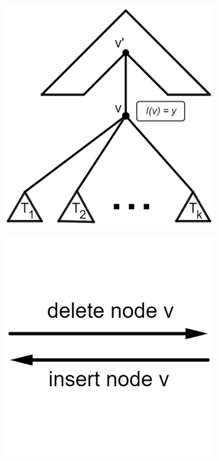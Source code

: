 \begin{figure}[b]
\begin{subfigure}[b]{0.18\textwidth}
    \end{subfigure}
    \begin{subfigure}[b]{0.18\textwidth}
	\caption{}
	\includegraphics[width=\textwidth]{figures/TreeEditOperation_2.png}
    \end{subfigure}
    \begin{subfigure}[b]{0.18\textwidth}
	\caption{}
	\includegraphics[width=\textwidth]{figures/TreeEditOperation_2,5.png}

\end{subfigure}
\end{figure}
